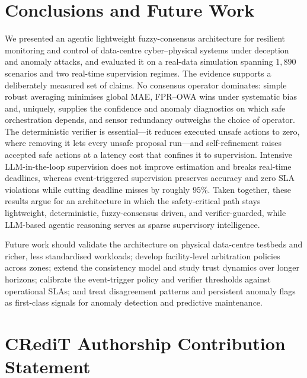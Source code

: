 \section{Conclusions and Future Work}
\label{sec:conclusions}

We presented an agentic lightweight fuzzy-consensus architecture for
resilient monitoring and control of data-centre cyber--physical systems
under deception and anomaly attacks, and evaluated it on a real-data
simulation spanning $1{,}890$ scenarios and two real-time supervision
regimes. The evidence supports a deliberately measured set of claims. No
consensus operator dominates: simple robust averaging minimises global
MAE, FPR--OWA wins under systematic bias and, uniquely, supplies the
confidence and anomaly diagnostics on which safe orchestration depends,
and sensor redundancy outweighs the choice of operator. The deterministic
verifier is essential---it reduces executed unsafe actions to zero, where
removing it lets every unsafe proposal run---and self-refinement raises
accepted safe actions at a latency cost that confines it to supervision.
Intensive LLM-in-the-loop supervision does not improve estimation and
breaks real-time deadlines, whereas event-triggered supervision preserves
accuracy and zero SLA violations while cutting deadline misses by roughly
$95\%$. Taken together, these results argue for an architecture in which
the safety-critical path stays lightweight, deterministic,
fuzzy-consensus driven, and verifier-guarded, while LLM-based agentic
reasoning serves as sparse supervisory intelligence.

Future work should validate the architecture on physical data-centre
testbeds and richer, less standardised workloads; develop facility-level
arbitration policies across zones; extend the consistency model and study
trust dynamics over longer horizons; calibrate the event-trigger policy
and verifier thresholds against operational SLAs; and treat disagreement
patterns and persistent anomaly flags as first-class signals for
anomaly detection and predictive maintenance.

\section*{CRediT Authorship Contribution Statement}

